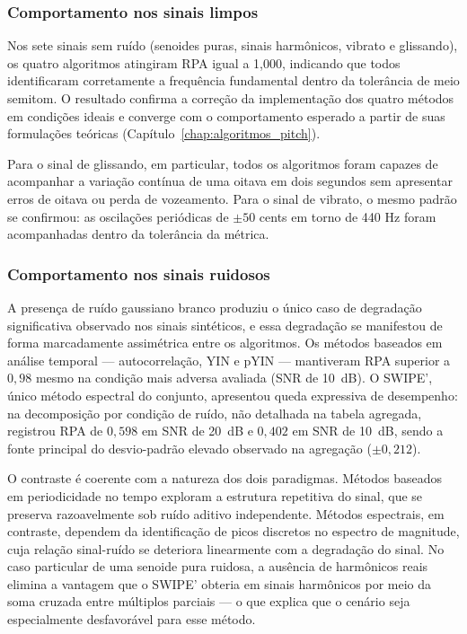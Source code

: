   \subsubsection{Comportamento nos sinais limpos}

  Nos sete sinais sem ruído (senoides puras, sinais harmônicos, vibrato e
  glissando), os quatro algoritmos atingiram RPA igual a 1{,}000, indicando que
  todos identificaram corretamente a frequência fundamental dentro da tolerância
  de meio semitom. O resultado confirma a correção da implementação dos
  quatro métodos em condições ideais e converge com o comportamento esperado a
  partir de suas formulações teóricas (Capítulo~\ref{chap:algoritmos_pitch}).

  Para o sinal de glissando, em particular, todos os algoritmos foram capazes
  de acompanhar a variação contínua de uma oitava em dois segundos sem
  apresentar erros de oitava ou perda de vozeamento. Para o sinal de vibrato, o
  mesmo padrão se confirmou: as oscilações periódicas de $\pm 50$ cents em
  torno de 440 Hz foram acompanhadas dentro da tolerância da métrica.

  \subsubsection{Comportamento nos sinais ruidosos}

  A presença de ruído gaussiano branco produziu o único caso de degradação
  significativa observado nos sinais sintéticos, e essa degradação se manifestou
  de forma marcadamente assimétrica entre os algoritmos. Os métodos baseados em
  análise temporal — autocorrelação, YIN e pYIN — mantiveram RPA superior a
  $0{,}98$ mesmo na condição mais adversa avaliada (SNR de 10~dB). O SWIPE',
  único método espectral do conjunto, apresentou queda expressiva de desempenho: na decomposição por condição de ruído, não detalhada na tabela agregada, registrou RPA de $0{,}598$ em SNR de 20~dB e $0{,}402$ em SNR de 10~dB, sendo a fonte principal do desvio-padrão elevado observado na agregação
  ($\pm 0{,}212$).

  O contraste é coerente com a natureza dos dois paradigmas. Métodos
  baseados em periodicidade no tempo exploram a estrutura repetitiva do sinal,
  que se preserva razoavelmente sob ruído aditivo independente. Métodos
  espectrais, em contraste, dependem da identificação de picos discretos no
  espectro de magnitude, cuja relação sinal-ruído se deteriora linearmente com
  a degradação do sinal. No caso particular de uma senoide pura ruidosa, a
  ausência de harmônicos reais elimina a vantagem que o SWIPE' obteria em
  sinais harmônicos por meio da soma cruzada entre múltiplos parciais — o que
  explica que o cenário seja especialmente desfavorável para esse método.

